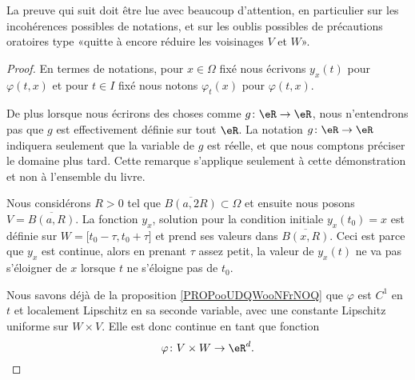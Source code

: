 \begin{probleme}
    La preuve qui suit doit être lue avec beaucoup d'attention, en particulier sur les incohérences possibles de notations, et sur les oublis possibles de précautions oratoires type «quitte à encore réduire les voisinages \( V\) et $W$».
\end{probleme}

\begin{proof}
    En termes de notations, pour \( x\in \Omega \) fixé nous écrivons \( y_x(t)\) pour \( \varphi(t,x)\) et pour \( t\in I\) fixé nous notons \( \varphi_t(x)\) pour \( \varphi(t,x)\).

    De plus lorsque nous écrirons des choses comme \( g\colon \eR\to \eR\), nous n'entendrons pas que \( g\) est effectivement définie sur tout \( \eR\). La notation \( g\colon \eR\to \eR\) indiquera seulement que la variable de \( g\) est réelle, et que nous comptons préciser le domaine plus tard. Cette remarque s'applique seulement à cette démonstration et non à l'ensemble du livre.

    Nous considérons \( R>0\) tel que \( \overline{ B(a,2R) }\subset\Omega\) et ensuite nous posons \( V=\overline{ B(a,R) }\). La fonction \( y_x\), solution pour la condition initiale \( y_x(t_0)=x\) est définie sur \( W=\mathopen[ t_0-\tau , t_0+\tau  \mathclose]\) et prend ses valeurs dans \( \overline{ B(x,R) }\). Ceci est parce que \( y_x\) est continue, alors en prenant \( \tau\) assez petit, la valeur de \( y_x(t)\) ne va pas s'éloigner de \( x\) lorsque \( t\) ne s'éloigne pas de \( t_0\).

    Nous savons déjà de la proposition \ref{PROPooUDQWooNFrNOQ} que \( \varphi\) est \( C^1\) en \( t\) et localement Lipschitz en sa seconde variable, avec une constante Lipschitz uniforme sur \( W\times V\). Elle est donc continue en tant que fonction
    \begin{equation}
        \varphi\colon V\times W\to \eR^d.
    \end{equation}
    

\end{proof}
